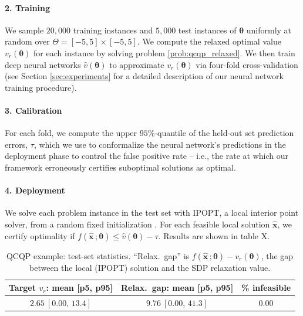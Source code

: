 \documentclass[10pt]{article} %
\theoremstyle{plain}
\theoremstyle{definition}
\theoremstyle{remark}
\begin{document}
\paragraph{2. Training} We sample $20{,}000$ training instances and $5{,}000$ test instances of $\bm{\theta}$ uniformly at random over $\Theta = [-5,5] \times [-5,5]$. We compute the relaxed optimal value $v_r(\bm{\theta})$ for each instance by solving problem \cref{prob:qcqp_relaxed}{}{}. We then train deep neural networks $\hat{v}(\bm{\theta})$ to approximate $v_r(\bm{\theta})$ via four-fold cross-validation (see Section \ref{sec:experiments} for a detailed description of our neural network training procedure).

\paragraph{3. Calibration} For each fold, we compute the upper $95\%$-quantile of the held-out set prediction errors, $\tau$, which we use to conformalize the neural network's predictions in the deployment phase to control the false positive rate -- i.e., the rate at which our framework erroneously certifies suboptimal solutions as optimal.

\paragraph{4. Deployment}

We solve each problem instance in the test set with IPOPT, a local interior point solver, from a random fixed initialization \citep{wachter2006implementation}. For each feasible local solution $\hat{\mathbf{x}}$, we certify optimality if $f(\hat{\mathbf{x}}\,;\bm{\theta}) \leq \hat{v}(\bm{\theta}) - \tau$. Results are shown in table X.

\begin{table}[H]
\centering
\caption{QCQP example: test-set statistics. ``Relax.\ gap'' is $f(\hat{\mathbf{x}}\,;\bm{\theta}) - v_r(\bm{\theta})$, the gap between the local (IPOPT) solution and the SDP relaxation value.}
\begin{tabular}{ccc}
\toprule
\textbf{Target } $v_r$\textbf{: mean [p5, p95]} & \textbf{Relax.\ gap: mean [p5, p95]} & \textbf{\% infeasible} \\
\midrule
$2.65\ [0.00,\,13.4]$ & $9.76\ [0.00,\,41.3]$ & $0.00$ \\
\bottomrule
\end{tabular}
\label{tab:QCQP-data}
\end{table}
\end{document}
